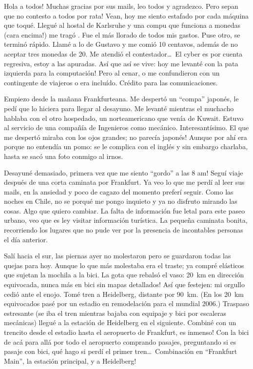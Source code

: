 \textexclamdown Hola a todos! Muchas gracias por sus mails, leo todos y
agradezco. \textexclamdown Pero sepan que no contesto a todos por rata! Vean,
hoy me siento estafado por cada m\'aquina que toqu\'e. Llegu\'e al hostal de
Karlsruhe y una compu que funciona a monedas (\textexclamdown cara encima!) me
trag\'o . Fue el m\'as llorado de todos mis gastos. Puse otro,
se termin\'o r\'apido. Llam\'e a lo de Gustavo y me comi\'o 10 centavos,
adem\'as de no aceptar tres monedas de 20. Me atendi\'o el contestador\ldots\ El
cyber es por cuenta regresiva, estoy a las apuradas. As\'i que as\'i se vive:
\textexclamdown hoy me levant\'e con la pata izquierda para la computaci\'on!
Pero al cenar, o me confundieron con un contingente de viajeros o era
inclu\'ido. Cr\'edito para las comunicaciones.

Empiezo desde la ma\~nana Frankfurteana. Me despert\'o un ``compa''
japon\'es, le ped\'i que lo hiciera para llegar al desayuno. Me levant\'e
mientras el muchacho hablaba con el otro hospedado, un norteamericano que
ven\'ia de Kuwait. Estuvo al servicio de una compa\~n\'ia de Ingenieros como
mec\'anico. Interesant\'isimo. El que me despert\'o miraba con los ojos grandes;
\textexclamdown no parec\'ia japon\'es! Aunque por ah\'i era porque no
entend\'ia un pomo: se le complica con el ingl\'es y sin embargo charlaba,
hasta se sac\'o una foto conmigo al irnos.

Desayun\'e demasiado, \textexclamdown primera vez que me siento ``gordo'' a las
8 am! Segu\'i viaje despu\'es de una corta caminata por Frankfurt. Ya veo lo que
me perd\'i al leer sus mails, en la ansiedad y poco de cagazo del momento
prefer\'i seguir. Como las noches en Chile, no se porqu\'e me pongo inquieto y
ya no disfruto mirando las cosas. Algo que quiero cambiar. La falta de
informaci\'on fue letal para este paseo urbano, veo que es ley visitar
informaci\'on tur\'istica. La peque\~na caminata bonita, recorriendo los lugares
que no pude ver por la presencia de incontables personas el d\'ia anterior.

Sal\'i hacia el sur, las piernas ayer no molestaron pero se guardaron todas
las quejas para hoy. Aunque lo que m\'as molestaba era el traste; ya compr\'e
el\'asticos que sujetan la mochila a la bici. La gota que rebals\'o el vaso:
20~km en direcci\'on equivocada, \textexclamdown nunca m\'as en bici sin mapas
detallados! As\'i que festejen: mi orgullo cedi\'o ante el enojo. Tom\'e tren a
Heidelberg, distante por 90~km. (En los 20~km equivocados pas\'e por un estadio
en remodelaci\'on para el mundial 2006.) Traspaso estresante (se iba el tren
mientras bajaba con equipaje y bici por escaleras mec\'anicas) llegu\'e a la
estaci\'on de Heidelberg en el siguiente. Combin\'e con un trencito desde el
estadio hasta el aeropuerto de Frankfurt, \textexclamdown es inmenso! Con la
bici de ac\'a para all\'a por todo el aeropuerto comprando pasajes, preguntando
si es pasaje con bici, qu\'e hago si perd\'i el primer tren\ldots\ Combinaci\'on
en ``Frankfurt Main'', la estaci\'on principal, \textexclamdown y a Heidelberg!

